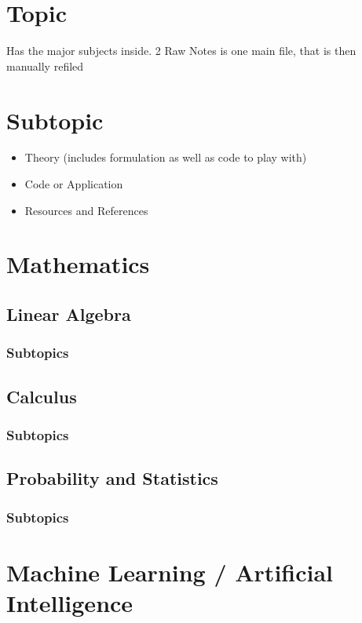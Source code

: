\documentclass[11pt]{article}
\begin{document}
\section{Topic}
\label{sec:orgdf1b2ba}
Has the major subjects inside. 2
Raw Notes is one main file, that is then manually refiled

\section{Subtopic}
\label{sec:orgef29ed5}
\begin{itemize}
\item Theory (includes formulation as well as code to play with)
\item Code or Application
\item Resources and References
\end{itemize}


\section{Mathematics}
\label{sec:org6079cb4}
\subsection{Linear Algebra}
\label{sec:org748cb2f}
\subsubsection{Subtopics}
\label{sec:org62d8f38}
\subsection{Calculus}
\label{sec:orgd8a65f6}
\subsubsection{Subtopics}
\label{sec:org6bbb145}
\subsection{Probability and Statistics}
\label{sec:orgc948b18}
\subsubsection{Subtopics}
\label{sec:org8b499a5}
\section{Machine Learning / Artificial Intelligence}
\label{sec:orgfc3c5a2}
\end{document}
